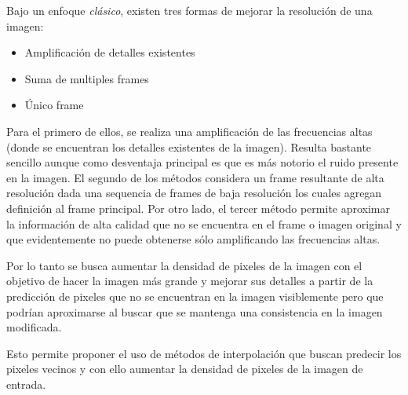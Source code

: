 \noindent
Bajo un enfoque \emph{clásico}, existen tres formas de mejorar la resolución 
de una imagen:

\begin{itemize}
    \item Amplificación de detalles existentes
    \item Suma de multiples frames
    \item Único frame
\end{itemize}

Para el primero de ellos, se realiza una amplificación de las frecuencias altas
(donde se encuentran los detalles existentes de la imagen). Resulta bastante 
sencillo aunque como desventaja principal es que es más notorio el ruido presente
en la imagen. 
El segundo de los métodos considera un frame resultante de alta resolución dada
una sequencia de frames de baja resolución los cuales agregan definición al frame
principal. Por otro lado, el tercer método permite aproximar la información de
alta calidad que no se encuentra en el frame o imagen original y que evidentemente
no puede obtenerse sólo amplificando las frecuencias altas. 

Por lo tanto se busca aumentar la densidad de pixeles de la imagen con el objetivo
de hacer la imagen más grande y mejorar sus detalles a partir de la predicción de 
pixeles que no se encuentran en la imagen visiblemente pero que podrían aproximarse
al buscar que se mantenga una consistencia en la imagen modificada. 

Esto permite proponer el uso de métodos de interpolación que buscan predecir los 
pixeles vecinos y con ello aumentar la densidad de pixeles de la imagen de entrada. 